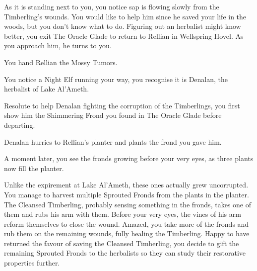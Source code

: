 As it is standing next to you, you notice sap is flowing slowly from the Timberling's wounds. You would like to help him since he saved your life in the woods, but you don't know what to do. Figuring out an herbalist might know better, you exit The Oracle Glade to return to Rellian in Wellspring Hovel. As you approach him, he turns to you.


You hand Rellian the Mossy Tumors.


You notice a Night Elf running your way, you recognise it is Denalan, the herbalist of Lake Al'Ameth.


Resolute to help Denalan fighting the corruption of the Timberlings, you first show him the Shimmering Frond you found in The Oracle Glade before departing.


Denalan hurries to Rellian's planter and plants the frond you gave him.


A moment later, you see the fronds growing before your very eyes, as three plants now fill the planter.


Unlike the expirement at Lake Al'Ameth, these ones actually grew uncorrupted. You manage to harvest multiple Sprouted Fronds from the plants in the planter. The Cleansed Timberling, probably sensing something in the fronds, takes one of them and rubs his arm with them. Before your very eyes, the vines of his arm reform themselves to close the wound. Amazed, you take more of the fronds and rub them on the remaining wounds, fully healing the Timberling. Happy to have returned the favour of saving the Cleansed Timberling, you decide to gift the remaining Sprouted Fronds to the herbalists so they can study their restorative properties further.

